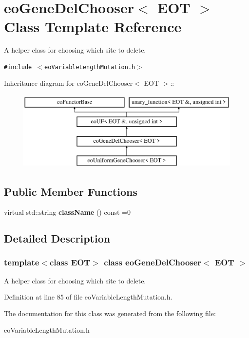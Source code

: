 \section{eo\-Gene\-Del\-Chooser$<$ EOT $>$ Class Template Reference}
\label{classeo_gene_del_chooser}
A helper class for choosing which site to delete.  


{\tt \#include $<$eo\-Variable\-Length\-Mutation.h$>$}

Inheritance diagram for eo\-Gene\-Del\-Chooser$<$ EOT $>$::\begin{figure}[H]
\begin{center}
\leavevmode
\includegraphics[height=4cm]{classeo_gene_del_chooser}
\end{center}
\end{figure}
\subsection*{Public Member Functions}
\begin{CompactItemize}
\item 
virtual std::string {\bf class\-Name} () const =0\label{classeo_gene_del_chooser_a0}

\end{CompactItemize}


\subsection{Detailed Description}
\subsubsection*{template$<$class EOT$>$ class eo\-Gene\-Del\-Chooser$<$ EOT $>$}

A helper class for choosing which site to delete. 



Definition at line 85 of file eo\-Variable\-Length\-Mutation.h.

The documentation for this class was generated from the following file:\begin{CompactItemize}
\item 
eo\-Variable\-Length\-Mutation.h\end{CompactItemize}
